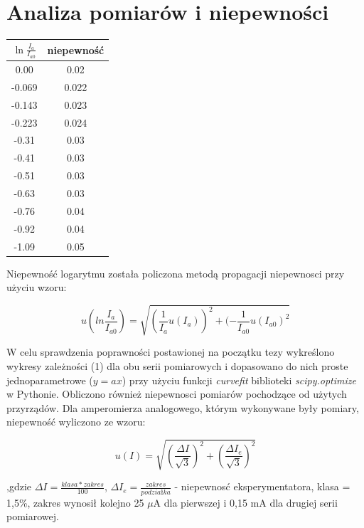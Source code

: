 \documentclass[a4paper,10pt]{article}
\begin{document}
\section{Analiza pomiarów i niepewności}
\begin{center}
\begin{tabular}{|c c|}
  \hline
  $\ln{\frac{I_a}{I_{a0}}}$& niepewność \\
  \hline
   0.00  &0.02  \\\hline
  -0.069 &0.022 \\\hline
  -0.143 &0.023 \\\hline
  -0.223 &0.024 \\\hline
  -0.31  &0.03  \\\hline
  -0.41  &0.03  \\\hline
  -0.51  &0.03\\\hline
  -0.63  &0.03\\\hline
  -0.76  &0.04\\\hline
  -0.92  &0.04\\\hline
  -1.09  &0.05\\\hline
\end{tabular}
\end{center}

\vspace{1cm}
Niepewność logarytmu została policzona metodą propagacji niepewnosci przy użyciu wzoru:

\begin{equation}
u(ln{\frac{I_a}{I_{a0}}}) = \sqrt{(\frac{1}{I_a} u(I_a))^2 + (-\frac{1}{I_{a0}} u(I_{a0})^2}
\end{equation}

W celu sprawdzenia poprawności postawionej na początku tezy wykreślono wykresy zależności (1) dla obu serii pomiarowych i dopasowano do nich proste jednoparametrowe ($y=ax$) przy użyciu funkcji \emph{curvefit} biblioteki \emph{scipy.optimize} w Pythonie. Obliczono również niepewnosci pomiarów pochodzące od użytych przyrządów. Dla amperomierza analogowego, którym wykonywane były pomiary,  niepewność wyliczono ze wzoru:

\begin{equation}
u(I) = \sqrt{(\frac{\Delta I}{\sqrt{3}})^2 + (\frac{\Delta I_e}{\sqrt{3}})^2}
\end{equation}

,gdzie $\Delta I = \frac{klasa*zakres}{100}$, $\Delta I_e = \frac{zakres}{podziałka}$ - niepewnosć eksperymentatora, klasa = 1,5\%, zakres wynosił kolejno 25 $\mu$A dla pierwszej i 0,15 mA dla drugiej serii pomiarowej.
\end{document}
